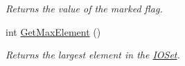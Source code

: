 \begin{DoxyCompactItemize}
\begin{DoxyCompactList}\small\item\em Returns the value of the marked flag. \item\end{DoxyCompactList}\item 
\hypertarget{class_i_o_set_a99b1856d8b320d7cf3bc3d5e1352d8c6}{
int \hyperlink{class_i_o_set_a99b1856d8b320d7cf3bc3d5e1352d8c6}{GetMaxElement} ()}
\label{class_i_o_set_a99b1856d8b320d7cf3bc3d5e1352d8c6}

\begin{DoxyCompactList}\small\item\em Returns the largest element in the \hyperlink{class_i_o_set}{IOSet}. \item\end{DoxyCompactList}\end{DoxyCompactItemize}
